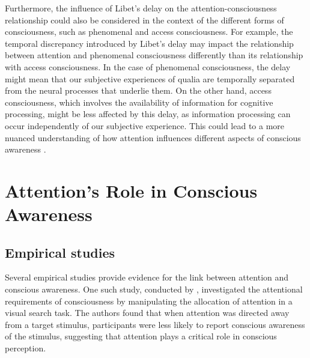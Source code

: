 \documentclass[10pt]{article}
\begin{document}
\begin{sloppypar}
  Furthermore, the influence of Libet’s delay on the attention-consciousness relationship could also be considered in the context of the different forms of consciousness, such as phenomenal and access consciousness. For example, the temporal discrepancy introduced by Libet’s delay may impact the relationship between attention and phenomenal consciousness differently than its relationship with access consciousness. In the case of phenomenal consciousness, the delay might mean that our subjective experiences of qualia are temporally separated from the neural processes that underlie them. On the other hand, access consciousness, which involves the availability of information for cognitive processing, might be less affected by this delay, as information processing can occur independently of our subjective experience. This could lead to a more nuanced understanding of how attention influences different aspects of conscious awareness \citep{dijksterhuis_goals_2010, kozuch_gorillas_2018}.

  \section{Attention’s Role in Conscious Awareness}
  \label{sec:evidence}

  \subsection{Empirical studies}
  \label{sec:empirical}

  Several empirical studies provide evidence for the link between attention and conscious awareness. One such study, conducted by \cite{cohen_attentional_2012}, investigated the attentional requirements of consciousness by manipulating the allocation of attention in a visual search task. The authors found that when attention was directed away from a target stimulus, participants were less likely to report conscious awareness of the stimulus, suggesting that attention plays a critical role in conscious perception.


\end{sloppypar}
\end{document}
